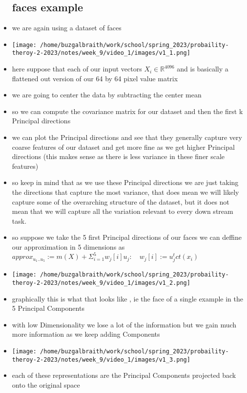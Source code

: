 \documentclass{article}
\begin{document}
\begin{itemize}
\subsection*{faces example}
\item we are again using a dataset of faces 
\item \texttt{[image: /home/buzgalbraith/work/school/spring\_2023/probaility-theroy-2-2023/notes/week\_9/video\_1/images/v1\_1.png]}
\item here suppose that each of our input vectors $X_i\in \mathbb{R}^{4096}$ and is basically a flattened out version of our 64 by 64 pixel value matrix 
\item we are going to center the data by subtracting the center mean 
\item so we can compute the covariance matrix for our dataset and then the first k Principal directions
\item we can plot the Principal directions and see that they generally capture very coarse features of our dataset and get more fine as we get higher Principal directions (this makes sense as there is less variance in these finer scale features)
\item so keep in mind that as we use these Principal directions we are just taking the directions that capture the most variance, that does mean we will likely capture some of the overarching structure of the dataset, but it does not mean that we will capture all the variation relevant to every down stream task. 
\item so suppose we take the 5 first Principal directions of our faces we can deffine our approximation in 5 dimensions as $approx_{u_1..u_5}:=m(X)+\Sigma_{i=1}^{5}w_{j}[i]u_{j}: \quad w_j[i]:=u_j^tct(x_i)$
\item \texttt{[image: /home/buzgalbraith/work/school/spring\_2023/probaility-theroy-2-2023/notes/week\_9/video\_1/images/v1\_2.png]}
\item graphically this is what that looks like , ie the face of a single example in the 5 Principal Components
\item with low Dimensionality we lose a lot of the information but we gain much more information as we keep adding Components
\item \texttt{[image: /home/buzgalbraith/work/school/spring\_2023/probaility-theroy-2-2023/notes/week\_9/video\_1/images/v1\_3.png]}
\item each of these representations are the Principal Components projected back onto the original space 

\end{itemize}
\end{document}
